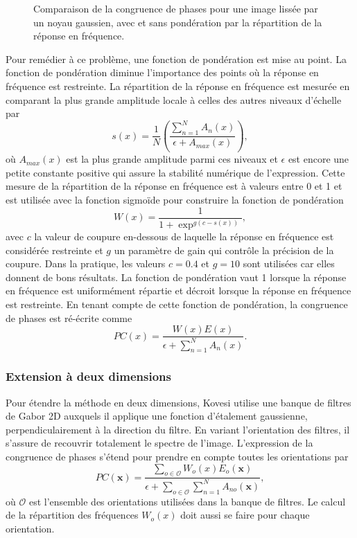 \begin{figure}
    \caption[Congruence de phases pour une image lissée par noyau gaussien]{Comparaison de la congruence de phases pour une image lissée par un noyau gaussien, avec et sans pondération par la répartition de la réponse en fréquence.}
    \label{fig:phase-congruency-spread}
\end{figure}

Pour remédier à ce problème, une fonction de pondération est mise au point. La fonction de pondération diminue l'importance des points où la réponse en fréquence est restreinte. La répartition de la réponse en fréquence est mesurée en comparant la plus grande amplitude locale à celles des autres niveaux d'échelle par
\begin{equation}
    s(x) = \frac1N\left(\frac{\sum_{n=1}^{N}A_n(x)}{\epsilon + A_{max}(x)}\right),
\end{equation}
où $A_{max}(x)$ est la plus grande amplitude parmi ces niveaux et $\epsilon$ est encore une petite constante positive qui assure la stabilité numérique de l'expression. Cette mesure de la répartition de la réponse en fréquence est à valeurs entre 0 et 1 et est utilisée avec la fonction sigmoïde pour construire la fonction de pondération
\begin{equation}
    W(x) = \frac{1}{1 + \exp^{g(c-s(x))}},
\end{equation}
avec $c$ la valeur de coupure en-dessous de laquelle la réponse en fréquence est considérée restreinte et $g$ un paramètre de gain qui contrôle la précision de la coupure. Dans la pratique, les valeurs $c = 0.4$ et $g = 10$ sont utilisées car elles donnent de bons résultats. La fonction de pondération vaut 1 lorsque la réponse en fréquence est uniformément répartie et décroit lorsque la réponse en fréquence est restreinte. En tenant compte de cette fonction de pondération, la congruence de phases est ré-écrite comme
\begin{equation}
    PC(x) = \frac{W(x)E(x)}{\epsilon + \sum_{n=1}^{N} A_n(x)}.
\end{equation}

\subsubsection{Extension à deux dimensions}

Pour étendre la méthode en deux dimensions, Kovesi utilise une banque de filtres de Gabor 2D auxquels il applique une fonction d'étalement gaussienne, perpendiculairement à la direction du filtre. En variant l'orientation des filtres, il s'assure de recouvrir totalement le spectre de l'image. L'expression de la congruence de phases s'étend pour prendre en compte toutes les orientations par
\begin{equation}
    PC(\mathbf{x}) = \frac{\sum_{o\in \mathcal{O}} W_o(x)E_o(\mathbf{x})}{\epsilon + \sum_{o \in \mathcal{O}}\sum_{n=1}^{N} A_{no}(\mathbf{x})},
\end{equation}
où $\mathcal{O}$ est l'ensemble des orientations utilisées dans la banque de filtres. Le calcul de la répartition des fréquences $W_o(x)$ doit aussi se faire pour chaque orientation.

